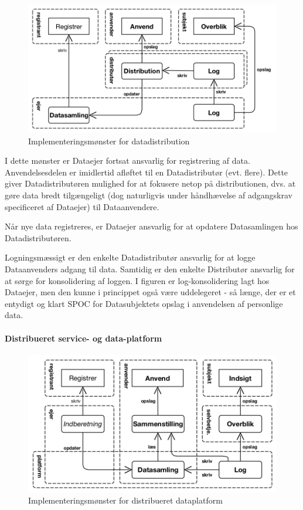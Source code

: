 \begin{figure}
\centering
\includegraphics[width=\textwidth]{figures/use-dist.png}
\caption{Implementeringsmønster for datadistribution}
\end{figure}

I dette mønster er Dataejer fortsat ansvarlig for registrering af data.
Anvendelsesdelen er imidlertid afløftet til en Datadistributør (evt.
flere). Dette giver Datadistributøren mulighed for at fokusere netop på
distributionen, dvs. at gøre data bredt tilgængeligt (dog naturligvis
under håndhævelse af adgangskrav specificeret af Dataejer) til
Dataanvendere.

Når nye data registreres, er Dataejer ansvarlig for at opdatere
Datasamlingen hos Datadistributøren.

Logningsmæssigt er den enkelte Datadistributør ansvarlig for at logge
Dataanvenders adgang til data. Samtidig er den enkelte Distributør
ansvarlig for at sørge for konsolidering af loggen. I figuren er
log-konsolidering lagt hos Dataejer, men den kunne i princippet også
være uddelegeret - så længe, der er et entydigt og klart SPOC for
Datasubjektets opslag i anvendelsen af personlige data.

\paragraph{Distribueret service- og
data-platform}\label{distribueret-service--og-data-platform}

\begin{figure}
\centering
\includegraphics[width=\textwidth]{figures/use-plat.png}
\caption{Implementeringsmønster for distribueret dataplatform}
\end{figure}

